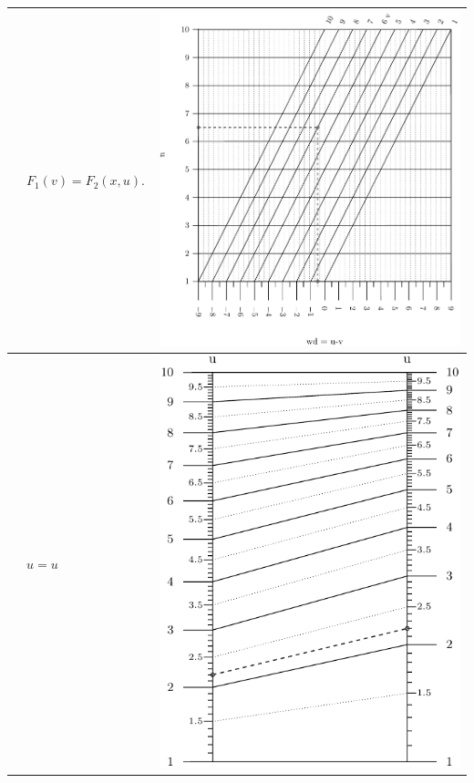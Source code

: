 \documentclass[a4paper,11pt,english]{sphinxmanual}
\begin{document}
\begin{tabulary}{\linewidth}{|L|L|L|}
\\
\hline
{\hyperref[types/types:type5-ref]{\emph{}}}
 & 
\(F_1(v) = F_2(x,u). \,\)
 & 
\includegraphics{ex_type5_nomo_1.pdf}
\\
\hline
{\hyperref[types/types:type6-ref]{\emph{}}}
 & 
\(u=u \,\)
 & 
\includegraphics{ex_type6_nomo_1.pdf}

\end{tabulary}
\end{document}
